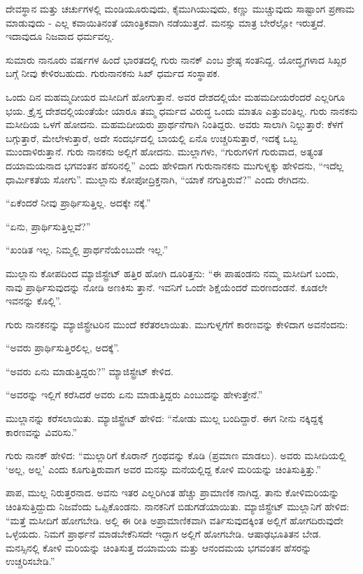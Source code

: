 ದೇವಸ್ಥಾನ ಮತ್ತು ಚರ್ಚುಗಳಲ್ಲಿ ಮಂಡಿಯೂರುವುದು, ಕೈಮುಗಿಯುವುದು, ಕಣ್ಣು ಮುಚ್ಚುವುದು ಸಾಷ್ಟಾಂಗ ಪ್ರಣಾಮ ಮಾಡುವುದು - ಎಲ್ಲ ಕವಾಯಿತಿನಂತೆ ಯಾಂತ್ರಿಕವಾಗಿ ನಡೆಯುತ್ತದೆ. ಮನಸ್ಸು ಮಾತ್ರ ಬೇರೆಲ್ಲೋ ಇರುತ್ತದೆ. ಇದಾವುದೂ ನಿಜವಾದ ಧರ್ಮವಲ್ಲ.

ಸುಮಾರು ನಾನೂರು ವರ್ಷಗಳ ಹಿಂದೆ ಭಾರತದಲ್ಲಿ ಗುರು ನಾನಕ್ ಎಂಬ ಶ್ರೇಷ್ಠ ಸಂತನಿದ್ದ. ಯೋದ್ಧೃಗಳಾದ ಸಿಖ್ಖರ ಬಗ್ಗೆ ನೀವು ಕೇಳಿರಬಹುದು. ಗುರುನಾನಕನು ಸಿಖ್ ಧರ್ಮದ ಸಂಸ್ಥಾಪಕ.

ಒಂದು ದಿನ ಮಹಮ್ಮದೀಯರ ಮಸೀದಿಗೆ ಹೋಗುತ್ತಾನೆ. ಅವರ ದೇಶದಲ್ಲಿಯೇ ಮಹಮದೀಯರೆಂದರೆ ಎಲ್ಲರಿಗೂ ಭಯ. ಕ್ರೈಸ್ತ ದೇಶದಲ್ಲಿಯಂತೆಯೇ ಯಾರೂ ತಮ್ಮ ಧರ್ಮದ ವಿರುದ್ಧ ಒಂದು ಮಾತೂ ಎತ್ತುವಂತಿಲ್ಲ. ಗುರು ನಾನಕನು ಮಸೀದಿಯ ಒಳಗೆ ಹೋದನು. ಮಹಮದೀಯರು ಪ್ರಾರ್ಥನೆಗಾಗಿ ನಿಂತಿದ್ದರು. ಅವರು ಸಾಲಾಗಿ ನಿಲ್ಲುತ್ತಾರೆ: ಕೆಳಗೆ ಬಗ್ಗುತ್ತಾರೆ, ಮೇಲೇಳುತ್ತಾರೆ, ಅದೇ ಸಂದರ್ಭದಲ್ಲಿ ಬಾಯಲ್ಲಿ ಏನೊ ಉಚ್ಚರಿಸುತ್ತಾರೆ, ಇದಕ್ಕೆ ಒಬ್ಬ ಮುಂದಾಳಿರುತ್ತಾನೆ. ಗುರು ನಾನಕನು ಅಲ್ಲಿಗೆ ಹೋದನು. ಮುಲ್ಲಾಗಳು, “ಗುರುಗಳಿಗೆ ಗುರುವಾದ, ಅತ್ಯಂತ ದಯಾಮಯನಾದ ಭಗವಂತನ ಹೆಸರಿನಲ್ಲಿ” ಎಂದು ಹೇಳಿದಾಗ ಗುರುನಾನಕನು ಮುಗುಳ್ನಕ್ಕು ಹೇಳಿದನು, “ಇದೆಲ್ಲ ಧಾರ್ಮಿಕತೆಯ ಸೋಗು”. ಮುಲ್ಲಾನು ಕೋಪೋದ್ರಿಕ್ತನಾಗಿ, “ಯಾಕೆ ನಗುತ್ತಿರುವೆ?” ಎಂದು ರೇಗಿದನು.

“ಏಕೆಂದರೆ ನೀವು ಪ್ರಾರ್ಥಿಸುತ್ತಿಲ್ಲ. ಅದಕ್ಕೇ ನಕ್ಕೆ.”

“ಏನು, ಪ್ರಾರ್ಥಿಸುತ್ತಿಲ್ಲವೆ?”

“ಖಂಡಿತ ಇಲ್ಲ. ನಿಮ್ಮಲ್ಲಿ ಪ್ರಾರ್ಥನೆಯೆಂಬುದೇ ಇಲ್ಲ.”

ಮುಲ್ಲಾನು ಕೋಪದಿಂದ ಮ್ಯಾಜಿಸ್ಟ್ರೇಟ್ ಹತ್ತಿರ ಹೋಗಿ ದೂರಿತ್ತನು: “ಈ ಪಾಷಂಡನು ನಮ್ಮ ಮಸೀದಿಗೆ ಬಂದು, ನಾವು ಪ್ರಾರ್ಥಿಸುವುದನ್ನು ನೋಡಿ ಅಣಕಿಸು ತ್ತಾನೆ. ಇವನಿಗೆ ಒಂದೇ ಶಿಕ್ಷೆಯೆಂದರೆ ಮರಣದಂಡನೆ. ಕೂಡಲೇ ಇವನನ್ನು ಕೊಲ್ಲಿ”.

ಗುರು ನಾನಕನನ್ನು ಮ್ಯಾಜಿಸ್ಟ್ರೇಟರಿನ ಮುಂದೆ ಕರೆತರಲಾಯಿತು. ಮುಗುಳ್ನಗೆಗೆ ಕಾರಣವನ್ನು ಕೇಳಿದಾಗ ಅವನೆಂದನು:

“ಅವರು ಪ್ರಾರ್ಥಿಸುತ್ತಿರಲಿಲ್ಲ, ಅದಕ್ಕೆ”.

“ಅವರು ಏನು ಮಾಡುತ್ತಿದ್ದರು?” ಮ್ಯಾಜಿಸ್ಟ್ರೇಟ್ ಕೇಳಿದ.

“ಅವರನ್ನು ಇಲ್ಲಿಗೆ ಕರೆಸಿದರೆ ಅವರು ಏನು ಮಾಡುತ್ತಿದ್ದರು ಎಂಬುದನ್ನು ಹೇಳುತ್ತೇನೆ.”

ಮುಲ್ಲಾನನ್ನು ಕರೆಸಲಾಯಿತು. ಮ್ಯಾಜಿಸ್ಟ್ರೇಟ್ ಹೇಳಿದ: “ನೋಡು ಮುಲ್ಲ ಬಂದಿದ್ದಾರೆ. ಈಗ ನೀನು ನಕ್ಕಿದ್ದಕ್ಕೆ ಕಾರಣವನ್ನು ವಿವರಿಸು.”

ಗುರು ನಾನಕ್ ಹೇಳಿದ: “ಮುಲ್ಲಾರಿಗೆ ಕೊರಾನ್ ಗ್ರಂಥವನ್ನು ಕೊಡಿ (ಪ್ರಮಾಣ ಮಾಡಲು). ಅವರು ಮಸೀದಿಯಲ್ಲಿ ‘ಅಲ್ಲ, ಅಲ್ಲ’ ಎಂದು ಕೂಗುತ್ತಿರುವಾಗ ಅವರ ಮನಸ್ಸು ಮನೆಯಲ್ಲಿದ್ದ ಕೋಳಿ ಮರಿಯನ್ನು ಚಿಂತಿಸುತ್ತಿತ್ತು.”

ಪಾಪ, ಮುಲ್ಲ ನಿರುತ್ತರನಾದ. ಅವನು ಇತರ ಎಲ್ಲರಿಗಿಂತ ಹೆಚ್ಚು ಪ್ರಾಮಾಣಿಕ ನಾಗಿದ್ದ. ತಾನು ಕೋಳಿಮರಿಯನ್ನು ಚಿಂತಿಸುತ್ತಿದ್ದುದು ನಿಜವೆಂದು ಒಪ್ಪಿಕೊಂಡನು. ನಾನಕನಿಗೆ ಬಿಡುಗಡೆಯಾಯಿತು. ಮ್ಯಾಜಿಸ್ಟ್ರೇಟ್ ಮುಲ್ಲಾನಿಗೆ ಹೇಳಿದ: “ಮತ್ತೆ ಮಸೀದಿಗೆ ಹೋಗಬೇಡಿ. ಅಲ್ಲಿ ಈ ರೀತಿ ಅಪ್ರಾಮಾಣಿಕವಾಗಿ ವರ್ತಿಸುವುದಕ್ಕಿಂತ ಅಲ್ಲಿಗೆ ಹೋಗದಿರುವುದೇ ಒಳ್ಳೆಯದು. ನಿಮಗೆ ಪ್ರಾರ್ಥನೆ ಮಾಡಬೇಕೆನಿಸದೇ ಇದ್ದಾಗ ಅಲ್ಲಿಗೆ ಹೋಗಬೇಡಿ. ಆಷಾಢಭೂತಿತನ ಬೇಡ. ಮನಸ್ಸಿನಲ್ಲಿ ಕೋಳಿ ಮರಿಯನ್ನು ಚಿಂತಿಸುತ್ತ ದಯಾಮಯ ಮತ್ತು ಆನಂದಮಯ ಭಗವಂತನ ಹೆಸರನ್ನು ಉಚ್ಚರಿಸಬೇಡಿ.”

